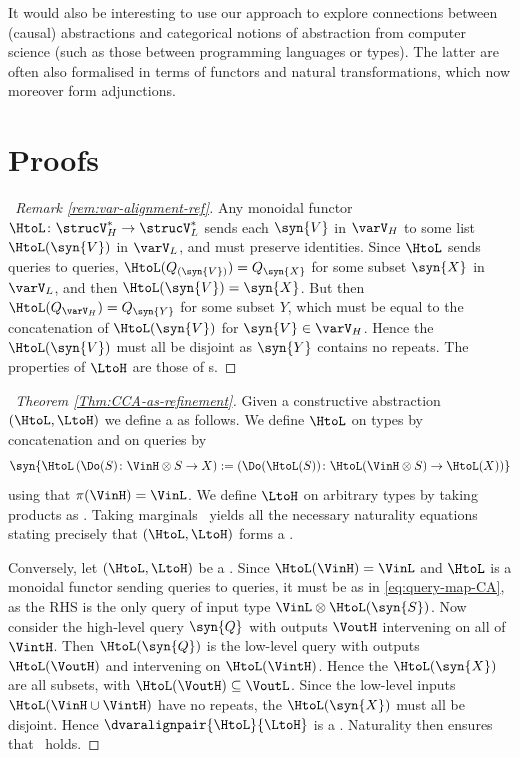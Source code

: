 \documentclass{article}
\begin{document}
{It would also be interesting to use our approach to explore connections between (causal) abstractions and categorical notions of abstraction from computer science (such as those between programming languages or types). The latter are often also formalised in terms of functors and natural transformations, which now moreover form adjunctions. 






\appendix


\section{Proofs}\label{app:proofs}


\begin{proof}[\proofof~Remark \ref{rem:var-alignment-ref}]
Any monoidal functor $\HtoL \colon \strucV^*_H \to \strucV^*_L$ sends each  $\syn{V}$ in $\varV_H$ to some list $\HtoL(\syn{V})$ in $\varV_L$, and must preserve identities. Since $\HtoL$ sends queries to queries, $\HtoL(Q_{(\syn{V})}) = Q_{\syn{X}}$ for some subset $\syn{X}$ in $\varV_L$, and then $\HtoL(\syn{V}) = \syn{X}$. But then $\HtoL(Q_{\varV_H}) = Q_{\syn{Y}}$ for some subset $Y$, which must be equal to the concatenation of $\HtoL(\syn{V})$ for ${\syn{V} \in \varV_H}$. Hence the $\HtoL(\syn{V})$ must all be disjoint as $\syn{Y}$ contains no repeats. The properties of $\LtoH$ are those of \qdown s. 
\end{proof}


\begin{proof}[\proofof~Theorem \ref{Thm:CCA-as-refinement}]
Given a constructive abstraction $(\HtoL, \LtoH)$ we define a \qdown{} as follows. We define $ \HtoL$ on types by concatenation and on queries by 
\begin{equation} \label{eq:query-map-CA}
\syn{\HtoL \left(\Do(S) \colon \VinH \otimes S \to X \right) := \left( \Do(\HtoL(S)) \colon \HtoL(\VinH \otimes S) \to \HtoL(X) \right)}
\end{equation} 
using that $\pi(\VinH) = \VinL$. We define $\LtoH$ on arbitrary types by taking products as . Taking marginals \ yields all the necessary naturality equations stating precisely that $(\HtoL,\LtoH)$ forms a \qdown. 

Conversely, let $(\HtoL, \LtoH)$ be a \qdown. Since $\HtoL(\VinH) = \VinL$ and $\HtoL$ is a monoidal functor sending queries to queries, it must be as in \eqref{eq:query-map-CA}, as the RHS is the only query of input type $\VinL \otimes \HtoL(\syn{S})$. Now consider the high-level query $\syn{Q}$ with outputs $\VoutH$ intervening on all of $\VintH$. Then $\HtoL(\syn{Q})$ is the low-level query with outputs $\HtoL(\VoutH)$ and intervening on $\HtoL(\VintH)$. Hence the $\HtoL(\syn{X})$ are all subsets, with $\HtoL(\VoutH) \subseteq \VoutL$. Since the low-level inputs $\HtoL(\VinH \cup \VintH)$ have no repeats, the $\HtoL(\syn{X})$ must all be disjoint.  
 Hence $\dvaralignpair{\HtoL}{\LtoH}$ is a \varalign.   
Naturality then ensures that \rl{\eqref{eq:CAabstraction}}\ holds. 
\end{proof}


}
\end{document}
